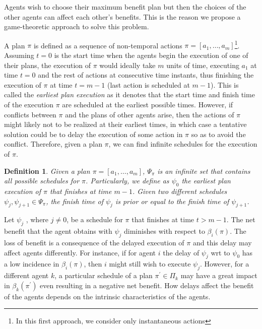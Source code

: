 \documentclass[letterpaper]{article}
\newtheorem{definition}{Definition}
\begin{document}
Agents wish to choose their maximum benefit plan but then the choices of the other agents can affect each other's benefits. This is the reason we propose a game-theoretic approach to solve this problem.


A plan $\pi$ is defined as a sequence of non-temporal actions $\pi =[ a_1, \ldots, a_m ]$\footnote{In this first approach, we consider only instantaneous actions}. Assuming $t=0$ is the start time when the agents begin the execution of one of their plans, the execution of $\pi$ would ideally take $m$ units of time, executing $a_1$ at time $t=0$ and the rest of actions at consecutive time instants, thus finishing the execution of $\pi$ at time $t=m-1$ (last action is scheduled at $m-1$). This is called the \emph{earliest plan execution} as it denotes that the start time and finish time of the execution $\pi$ are scheduled at the earliest possible times. However, if conflicts between $\pi$ and the plans of other agents arise, then the actions of $\pi$ might likely not to be realized at their earliest times, in which case a tentative solution could be to delay the execution of some action in $\pi$ so as to avoid the conflict. Therefore, given a plan $\pi$, we can find infinite schedules for the execution of $\pi$.


\begin{definition} Given a plan $\pi =[ a_1, \ldots, a_m ]$,  $\Psi_{\pi}$ is an infinite set that contains all possible schedules for $\pi$. Particularly, we define as $\psi_0$ the earliest plan execution of $\pi$ that finishes at time $m-1$. Given two different schedules $\psi_j, \psi_{j+1} \in \Psi_{\pi}$, the finish time of $\psi_j$ is prior or equal to the finish time of $\psi_{j+1}$.
\end{definition}

Let $\psi_j$ , where $j \not= 0$, be a schedule for $\pi$ that finishes at time $t > m-1$. The net benefit that the agent obtains with $\psi_j$ diminishes with respect to $\beta_i(\pi)$. The loss of benefit is a consequence of the delayed execution of $\pi$ and this delay may affect agents differently. For instance, if for agent $i$ the delay of $\psi_j$ wrt to $\psi_0$ has a low incidence in $\beta_i(\pi)$, then $i$ might still wish to execute $\psi_j$. However, for a different agent $k$, a particular schedule of
a plan $\pi^\prime \in \Pi_k$  may have a great impact in $\beta_k(\pi^\prime)$ even resulting in a negative net benefit. How delays affect the benefit of the agents depends on the intrinsic characteristics of the agents.
\end{document}

